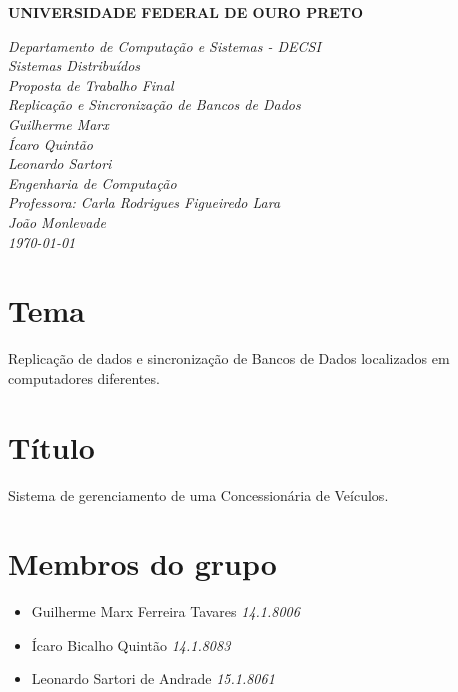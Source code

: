 \documentclass{article}
\begin{document}
\begin{titlepage}

\begin{center}
\textbf{UNIVERSIDADE FEDERAL DE OURO PRETO}

\textit{Departamento de Computação e Sistemas - DECSI\\Sistemas Distribuídos\\\vspace{2.5cm} Proposta de Trabalho Final\\Replicação e Sincronização de Bancos de Dados\\\vspace{3.5cm}Guilherme Marx \\ Ícaro Quintão \\ Leonardo Sartori\\\vspace{2cm} Engenharia de Computação\\\vspace{5cm} Professora: Carla Rodrigues Figueiredo Lara\\\vfill João Monlevade \\ \today}



\end{center}

\end{titlepage}

\section*{Tema}

Replicação de dados e sincronização de Bancos de Dados localizados em computadores diferentes.

\section*{Título}

Sistema de gerenciamento de uma Concessionária de Veículos.

\section*{Membros do grupo}

\begin{itemize}
\item Guilherme Marx Ferreira Tavares \hfill \emph{14.1.8006}
\item Ícaro Bicalho Quintão \hfill \emph{14.1.8083}
\item Leonardo Sartori de Andrade \hfill \emph{15.1.8061}
\end{itemize}
\end{document}
